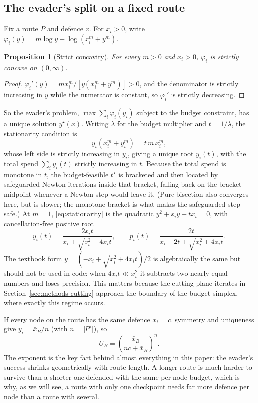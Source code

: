 \documentclass[11pt,a4paper]{article}
\theoremstyle{plain}
\newtheorem{proposition}[theorem]{Proposition}
\theoremstyle{definition}
\newcommand{\XB}{\bar{x}_B}
\begin{document}
\subsection{The evader's split on a fixed route}
\label{sec:methods-inner}

Fix a route $P$ and defence $x$. For $x_i>0$, write
$\varphi_i(y)=m\log y-\log(x_i^m+y^m)$.

\begin{proposition}[Strict concavity]
\label{prop:concave}
For every $m>0$ and $x_i>0$, $\varphi_i$ is strictly concave on
$(0,\infty)$.
\end{proposition}
\begin{proof}
$\varphi_i'(y)=m x_i^m/[y(x_i^m+y^m)]>0$, and the denominator is strictly
increasing in $y$ while the numerator is constant, so $\varphi_i'$ is
strictly decreasing.
\end{proof}

So the evader's problem, $\max\sum_i\varphi_i(y_i)$ subject to the budget
constraint, has a unique solution $y^{\star}(x)$. Writing $\lambda$ for the
budget multiplier and $t=1/\lambda$, the stationarity condition is
\begin{equation}
  y_i(x_i^m+y_i^m) = t\,m\,x_i^m,
  \label{eq:stationarity}
\end{equation}
whose left side is strictly increasing in $y_i$, giving a unique root
$y_i(t)$, with the total spend $\sum_i y_i(t)$ strictly increasing in
$t$. Because the total spend is monotone in $t$, the budget-feasible
$t^{\star}$ is bracketed and then located by safeguarded Newton
iterations inside that bracket, falling back on the bracket midpoint
whenever a Newton step would leave it. (Pure bisection also converges
here, but is slower; the monotone bracket is what makes the safeguarded
step safe.) At $m=1$, \eqref{eq:stationarity} is the quadratic
$y^2+x_iy-tx_i=0$, with cancellation-free positive root
\begin{equation}
  y_i(t)=\frac{2x_it}{x_i+\sqrt{x_i^2+4x_it}},
  \qquad
  p_i(t)=\frac{2t}{x_i+2t+\sqrt{x_i^2+4x_it}}.
  \label{eq:closed-form-m1}
\end{equation}
The textbook form $y=(-x_i+\sqrt{x_i^2+4x_it})/2$ is algebraically the
same but should not be used in code: when $4x_it\ll x_i^2$ it subtracts
two nearly equal numbers and loses precision. This matters because the
cutting-plane iterates in Section~\ref{sec:methods-cutting} approach the
boundary of the budget simplex, where exactly this regime occurs.

If every node on the route has the same defence $x_i=c$, symmetry and
uniqueness give $y_i=\XB/n$ (with $n=|P^{\circ}|$), so
\begin{equation}
  U_B = \left(\frac{\XB}{nc+\XB}\right)^{\!n}.
  \label{eq:symmetric}
\end{equation}
The exponent is the key fact behind almost everything in this paper: the
evader's success shrinks geometrically with route length. A longer route
is much harder to survive than a shorter one defended with the same
per-node budget, which is why, as we will see, a route with only one
checkpoint needs far more defence per node than a route with several.
\end{document}
